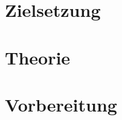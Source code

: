 %

%
\section{Zielsetzung}
\label{sec:Theorie}

\section{Theorie}

\section{Vorbereitung}
\cite{sample}

%
